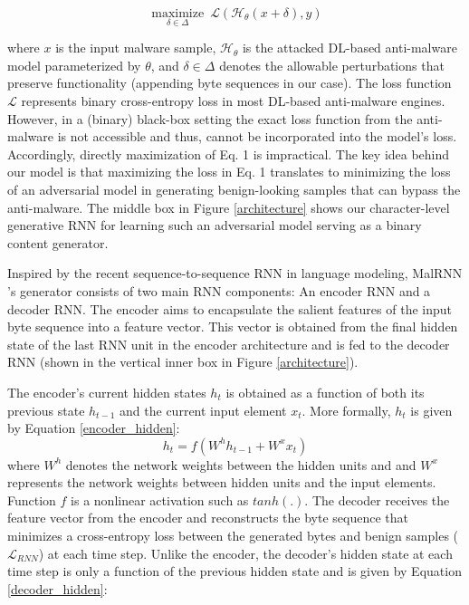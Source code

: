 \documentclass[letterpaper]{article}
\newcommand{\malrnn}{M\lowercase{a}lRNN }
\begin{document}
\begin{equation}
  \underset{\delta \in \Delta}{\operatorname{maximize}}\  \mathcal{L}(\mathcal{H}_\theta(x+\delta),y)
\end{equation}

where $x$ is the input malware sample, $\mathcal{H_\theta}$ is the attacked DL-based anti-malware model parameterized by $\theta$, and $\delta \in \Delta$ denotes the allowable perturbations that preserve functionality (appending byte sequences in our case). The loss function $\mathcal{L}$ represents binary cross-entropy loss in most DL-based anti-malware engines. However, in a (binary) black-box setting the exact loss function from the anti-malware is not accessible and thus, cannot be incorporated into the model's loss. Accordingly, directly maximization of Eq. 1 is impractical. The key idea behind our model is that maximizing the loss in Eq. 1 translates to minimizing the loss of an adversarial model in generating benign-looking samples that can bypass the anti-malware. The middle box in Figure \ref{architecture} shows our character-level generative RNN for learning such an adversarial model serving as a binary content generator.

Inspired by the recent sequence-to-sequence RNN in language modeling, \malrnn's generator consists of two main RNN components: An encoder RNN and a decoder RNN. The encoder aims to encapsulate the salient features of the input byte sequence into a feature vector. This vector is obtained from the final hidden state of the last RNN unit in the encoder architecture and is fed to the decoder RNN (shown in the vertical inner box in Figure \ref{architecture}). 

The encoder's current hidden states $h_t$ is obtained as a function of both its previous state $h_{t-1}$ and the current input element $x_t$. More formally, $h_t$ is given by Equation \ref{encoder_hidden}:
\begin{equation}
  h_t = f(W^{h}h_{t-1} + W^{x}x_t)
  \label {encoder_hidden}
\end{equation}
where $W^{h}$ denotes the network weights between the hidden units and and $W^{x}$ represents the network weights between hidden units and the input elements. Function $f$ is a nonlinear activation such as $tanh(.)$. The decoder receives the feature vector from the encoder and reconstructs the byte sequence that minimizes a cross-entropy loss between the generated bytes and benign samples ($\mathcal{L}_{RNN}$) at each time step. Unlike the encoder, the decoder's hidden state at each time step is only a function of the previous hidden state and is given by Equation \ref{decoder_hidden}:
\end{document}
